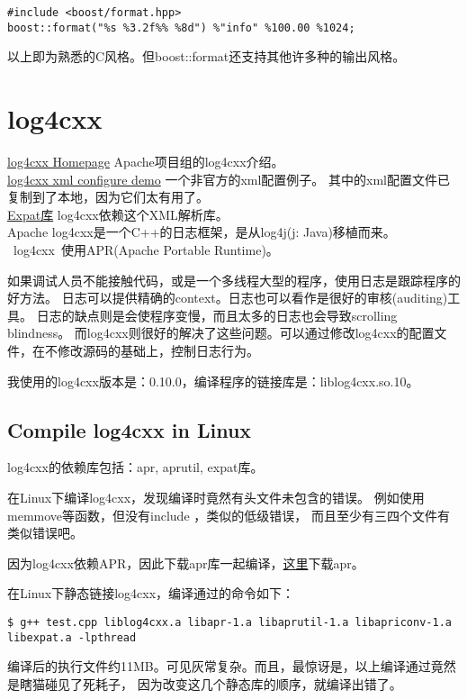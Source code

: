 \begin{lstlisting}
#include <boost/format.hpp>
boost::format("%s %3.2f%% %8d") %"info" %100.00 %1024;
\end{lstlisting}
以上即为熟悉的C风格。但boost::format还支持其他许多种的输出风格。

\chapter{log4cxx}
\noindent\href{http://logging.apache.org/log4cxx/index.html}{log4cxx Homepage} Apache项目组的log4cxx介绍。 \\
\noindent\href{http://www.dreamcubes.com/blog/?itemid=59}{log4cxx xml configure demo} 一个非官方的xml配置例子。
其中的xml配置文件已复制到了本地，因为它们太有用了。 \\
\noindent\href{http://expat.sourceforge.net/}{Expat库} log4cxx依赖这个XML解析库。\\

Apache log4cxx是一个C++的日志框架，是从log4j(j: Java)移植而来。
~log4cxx~使用APR(Apache Portable Runtime)。

如果调试人员不能接触代码，或是一个多线程大型的程序，使用日志是跟踪程序的好方法。
日志可以提供精确的context。日志也可以看作是很好的审核(auditing)工具。
日志的缺点则是会使程序变慢，而且太多的日志也会导致scrolling blindness。
而log4cxx则很好的解决了这些问题。可以通过修改log4cxx的配置文件，在不修改源码的基础上，控制日志行为。

我使用的log4cxx版本是：0.10.0，编译程序的链接库是：liblog4cxx.so.10。

\section{Compile log4cxx in Linux}
log4cxx的依赖库包括：apr, aprutil, expat库。


在Linux下编译log4cxx，发现编译时竟然有头文件未包含的错误。
例如使用memmove等函数，但没有include ，类似的低级错误，
而且至少有三四个文件有类似错误吧。

因为log4cxx依赖APR，因此下载apr库一起编译，\href{http://apr.apache.org/download.cgi}{这里}下载apr。

在Linux下静态链接log4cxx，编译通过的命令如下：
\begin{lstlisting}
$ g++ test.cpp liblog4cxx.a libapr-1.a libaprutil-1.a libapriconv-1.a libexpat.a -lpthread
\end{lstlisting}
编译后的执行文件约11MB。可见灰常复杂。而且，最惊讶是，以上编译通过竟然是瞎猫碰见了死耗子，
因为改变这几个静态库的顺序，就编译出错了。

